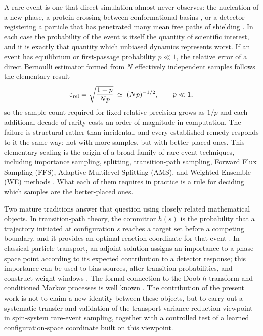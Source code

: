 \documentclass[a4paper,fleqn]{cas-sc}
\begin{document}
A rare event is one that direct simulation almost never observes: the nucleation of a new
phase, a protein crossing between conformational basins \citep{bolhuis2002}, or a detector
registering a particle that has penetrated many mean free paths of shielding
\citep{kahn1951,kalos2008}. In each case the probability
of the event is itself the quantity of scientific interest, and it is exactly that quantity
which unbiased dynamics represents worst. If an event has equilibrium or first-passage
probability $p\ll1$, the relative error of a direct Bernoulli estimator formed from $N$
effectively independent samples follows the elementary result \citep{kahn1951,kalos2008}
\begin{equation}
\varepsilon_{\rm rel}=\sqrt{\frac{1-p}{Np}}\;\simeq\;(Np)^{-1/2},\qquad p\ll1,
\label{eq:bernoulli}
\end{equation}
so the sample count required for fixed relative precision grows as $1/p$ and each additional
decade of rarity costs an order of magnitude in computation. The failure is structural rather
than incidental, and every established remedy responds to it the same way: not with more
samples, but with better-placed ones. This elementary scaling is the origin of a broad family
of rare-event techniques, including importance sampling,
splitting, transition-path sampling, Forward Flux Sampling (FFS), Adaptive Multilevel
Splitting (AMS), and Weighted Ensemble (WE) methods \citep{kahn1951,kalos2008,huber1996,
zuckerman2017,allen2009,cerou2007,bolhuis2002}. What each of them requires in practice is a
rule for deciding which samples are the better-placed ones.

Two mature traditions answer that question using closely related mathematical objects. In
transition-path theory, the committor $h(s)$ is the probability that a trajectory initiated
at configuration $s$ reaches a target set before a competing boundary, and it provides an
optimal reaction coordinate for that event \citep{e2006,metzner2009,vandeneijnden2010}. In
classical particle transport, an adjoint solution assigns an importance to a phase-space
point according to its expected contribution to a detector response; this importance can be
used to bias sources, alter transition probabilities, and construct weight windows
\citep{lewins1965,spanier1969,bell1970,wagner1998,haghighat2003}. The formal connection to
the Doob $h$-transform and conditioned Markov processes is well known
\citep{doob1984,touchette2009,chetrite2015}. The contribution of the present work is not to
claim a new identity between these objects, but to carry out a systematic transfer and
validation of the transport variance-reduction viewpoint in spin-system rare-event sampling,
together with a controlled test of a learned configuration-space coordinate built on this
viewpoint.
\end{document}
